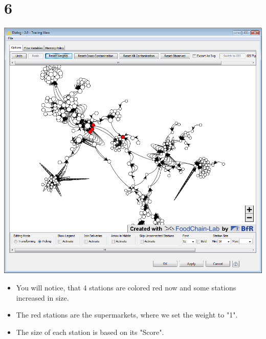 \documentclass{beamer}
\begin{document}
\section{6}
\begin{frame}
	\begin{center}
  		\includegraphics[height=0.6\textheight]{6.png}
	\end{center}
	\begin{itemize}
		\item You will notice, that 4 stations are colored red now and some stations increased in size.
		\item The red stations are the supermarkets, where we set the weight to "1".
		\item The size of each station is based on its "Score".
	\end{itemize}
\end{frame}
\end{document}
